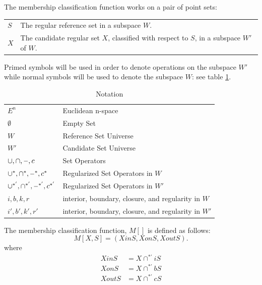 \documentclass[a4paper,11pt,oneside]{article}
\makeatletter
\newcommand{\minus}{\scalebox{0.9}[1.0]{$-$}} %
\newenvironment{conditions}
  {\par\vspace{\abovedisplayskip}\noindent\begin{tabular}{>{$}l<{$} @{${}={}$} l}}
  {\end{tabular}\par\vspace{\belowdisplayskip}}
\makeatother
\begin{document}
The membership classification function works on a pair of point sets:

\begin{conditions}
	S     &  The regular reference set in a subspace $W$. \\
	X     &  The candidate regular set $X$, classified with respect to $S$, in a subspace $W'$ of $W$. \\
\end{conditions}

Primed symbols will be used	in order to denote operations on the subspace $W'$ while normal symbols will be used to denote the subspace $W$: see table \ref{table:notations}.
 
\begin{table}
	\caption{Notation}
	\label{table:notations}
	\begin{tabularx}{\textwidth}{p{}X}
		\toprule
		$E^n$                                        & Euclidean n-space                                   \\
		$\emptyset$                                  & Empty Set                                           \\
		$W$                                          & Reference Set Universe                              \\
		$W'$                                         & Candidate Set Universe                              \\
		$\cup, \cap, \minus, c$                     & Set Operators                                       \\
		$\cup^*, \cap^*, \minus^*, c^*$             & Regularized Set Operators in $W$                    \\
		$\cup^{*'}, \cap^{*'}, \minus^{*'}, c^{*'}$ & Regularized Set Operators in $W'$                   \\
		$i, b, k, r$                                 & interior, boundary, closure, and regularity in $W$  \\
		$i', b', k', r'$                             & interior, boundary, closure, and regularity in $W'$ \\
		\bottomrule
	\end{tabularx}
\end{table}

\begin{definition}
	The membership classification function, $M[]$ is defined as follows:
	\begin{equation}
		M[X, S] = (XinS, XonS, XoutS).
	\end{equation}
	where
	\begin{align*}
		XinS  & = X \cap^{*'} iS \\
		XonS  & = X \cap^{*'} bS \\
		XoutS & = X \cap^{*'} cS 
	\end{align*}
\end{definition}
\end{document}
